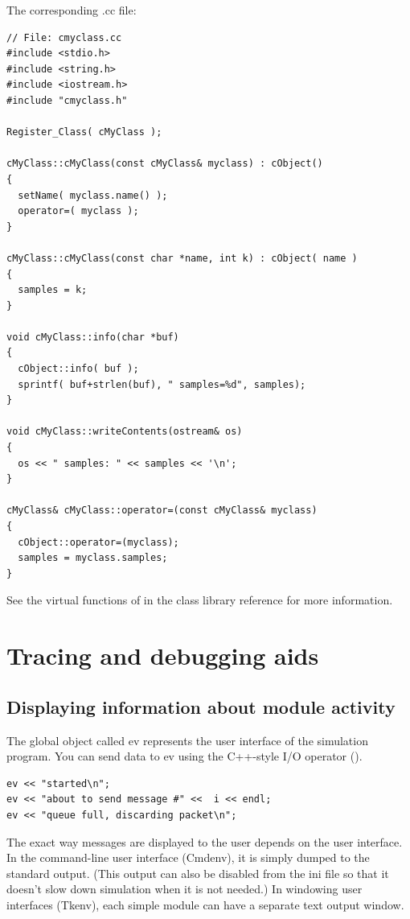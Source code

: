 The corresponding .cc file:

\begin{Verbatim}
// File: cmyclass.cc
#include <stdio.h>
#include <string.h>
#include <iostream.h>
#include "cmyclass.h"

Register_Class( cMyClass );

cMyClass::cMyClass(const cMyClass& myclass) : cObject()
{
  setName( myclass.name() );
  operator=( myclass );
}

cMyClass::cMyClass(const char *name, int k) : cObject( name )
{
  samples = k;
}

void cMyClass::info(char *buf)
{
  cObject::info( buf );
  sprintf( buf+strlen(buf), " samples=%d", samples);
}

void cMyClass::writeContents(ostream& os)
{
  os << " samples: " << samples << '\n';
}

cMyClass& cMyClass::operator=(const cMyClass& myclass)
{
  cObject::operator=(myclass);
  samples = myclass.samples;
}
\end{Verbatim}


See the virtual functions of  in the class library reference 
for more information.





\section{Tracing and debugging aids}

\subsection{Displaying information about module activity}

The global object called ev represents the user interface of the
simulation program. You can send data to ev using the
C++-style I/O operator (\ttt{<}\ttt{<}).

\begin{Verbatim}
ev << "started\n";
ev << "about to send message #" <<  i << endl;
ev << "queue full, discarding packet\n";
\end{Verbatim}


The exact way messages are displayed to the user depends on the user
interface. In the command-line user interface (Cmdenv),
it is simply dumped to the standard output. (This output can also be
disabled from the ini file so that it doesn't slow down simulation
when it is not needed.) In windowing user interfaces
(Tkenv), each simple module can have
a separate text output window.



